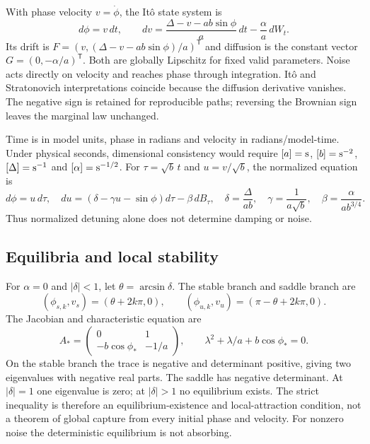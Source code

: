 \documentclass[11pt,a4paper]{article}
\begin{document}
With phase velocity $v=\dot\phi$, the It\^o state system is
\begin{equation}
d\phi=v\,dt,\qquad
dv=\frac{\Delta-v-ab\sin\phi}{a}\,dt-\frac{\alpha}{a}\,dW_t.
\label{eq:sde}
\end{equation}
Its drift is $F=(v,(\Delta-v-ab\sin\phi)/a)^\mathsf T$ and diffusion is the constant vector $G=(0,-\alpha/a)^\mathsf T$. Both are globally Lipschitz for fixed valid parameters. Noise acts directly on velocity and reaches phase through integration. It\^o and Stratonovich interpretations coincide because the diffusion derivative vanishes. The negative sign is retained for reproducible paths; reversing the Brownian sign leaves the marginal law unchanged.

Time is in model units, phase in radians and velocity in radians/model-time. Under physical seconds, dimensional consistency would require $[a]={\rm s}$, $[b]={\rm s}^{-2}$, $[\Delta]={\rm s}^{-1}$ and $[\alpha]={\rm s}^{-1/2}$. For $\tau=\sqrt b\,t$ and $u=v/\sqrt b$, the normalized equation is
\begin{equation}
d\phi=u\,d\tau,\quad du=(\delta-\gamma u-\sin\phi)d\tau-\beta\,dB_\tau,
\quad
\delta=\frac{\Delta}{ab},\quad \gamma=\frac1{a\sqrt b},\quad
\beta=\frac{\alpha}{ab^{3/4}}.
\end{equation}
Thus normalized detuning alone does not determine damping or noise.

\subsection{Equilibria and local stability}
For $\alpha=0$ and $|\delta|<1$, let $\theta=\arcsin\delta$. The stable branch and saddle branch are
\begin{equation}
(\phi_{s,k},v_s)=(\theta+2k\pi,0),\qquad
(\phi_{u,k},v_u)=(\pi-\theta+2k\pi,0).
\end{equation}
The Jacobian and characteristic equation are
\begin{equation}
A_* =\begin{pmatrix}0&1\\-b\cos\phi_*&-1/a\end{pmatrix},\qquad
\lambda^2+\lambda/a+b\cos\phi_*=0.
\end{equation}
On the stable branch the trace is negative and determinant positive, giving two eigenvalues with negative real parts. The saddle has negative determinant. At $|\delta|=1$ one eigenvalue is zero; at $|\delta|>1$ no equilibrium exists. The strict inequality is therefore an equilibrium-existence and local-attraction condition, not a theorem of global capture from every initial phase and velocity. For nonzero noise the deterministic equilibrium is not absorbing.
\end{document}
